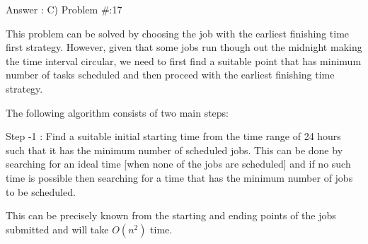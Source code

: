 \documentclass[letterpaper,portrait,12pt]{article}
\begin{document}
\begin{flushleft}
Answer : C) Problem \#:17
\end{flushleft}


\begin{flushleft}

\end{flushleft}


\begin{flushleft}
This problem can be solved by choosing the job with the earliest finishing time first strategy. However, given that some jobs run though out the midnight making the time interval circular, we need to first find a suitable point that has minimum number of tasks scheduled and then proceed with the earliest finishing time strategy.
\end{flushleft}


\begin{flushleft}

\end{flushleft}


\begin{flushleft}
The following algorithm consists of two main steps:
\end{flushleft}


\begin{flushleft}

\end{flushleft}


\begin{flushleft}
Step -1 : Find a suitable initial starting time from the time range of 24 hours such that it has the minimum number of scheduled jobs. This can be done by searching for an ideal time [when none of the jobs are scheduled] and if no such time is possible then searching for a time that has the minimum number of jobs to be scheduled.
\end{flushleft}


\begin{flushleft}

\end{flushleft}


\begin{flushleft}
This can be precisely known from the starting and ending points of the jobs submitted and will take $O(n^2)$ time.
\end{flushleft}


\begin{flushleft}

\end{flushleft}
\end{document}
